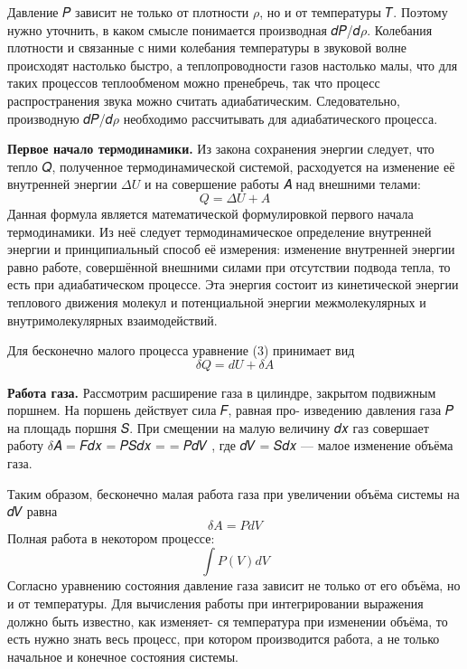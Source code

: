 \documentclass[12pt]{article}
\begin{document}
    Давление 𝑃 зависит не только от плотности $\rho$, но и от температуры 𝑇. Поэтому нужно уточнить, в каком смысле понимается
    производная 𝑑𝑃/𝑑$\rho$.
    Колебания плотности и связанные с ними колебания температуры в звуковой волне происходят настолько быстро, а теплопроводности газов настолько малы, что для таких процессов теплообменом можно пренебречь, так что процесс распространения звука можно считать адиабатическим. Следовательно, производную
    𝑑𝑃/𝑑$\rho$ необходимо рассчитывать для адиабатического процесса.
    
    \textbf{Первое начало термодинамики.} Из закона сохранения энергии следует, что тепло 𝑄, полученное термодинамической системой, расходуется на изменение её внутренней энергии $\Delta U$ и на
    совершение работы 𝐴 над внешними телами:
    \begin{equation}
    Q = \Delta U + A
    \end{equation}
    Данная формула является математической формулировкой первого начала термодинамики. Из неё следует термодинамическое
    определение внутренней энергии и принципиальный способ её измерения: изменение внутренней энергии равно работе, совершённой внешними силами при отсутствии подвода тепла, то есть при
    адиабатическом процессе. Эта энергия состоит из кинетической
    энергии теплового движения молекул и потенциальной энергии
    межмолекулярных и внутримолекулярных взаимодействий.
    
    Для бесконечно малого процесса уравнение (3) принимает вид
    \begin{equation}
    \delta Q = dU + \delta A
    \end{equation}
    
    \textbf{Работа газа.} Рассмотрим расширение газа в цилиндре, закрытом
    подвижным поршнем. На поршень действует сила 𝐹, равная про-
    изведению давления газа 𝑃 на площадь поршня 𝑆. При смещении
    на малую величину 𝑑𝑥 газ совершает работу $\delta$𝐴 = 𝐹𝑑𝑥 = 𝑃𝑆𝑑𝑥 =
    = 𝑃𝑑𝑉 , где 𝑑𝑉 = 𝑆𝑑𝑥 — малое изменение объёма газа.
    
    Таким образом, бесконечно малая работа газа при увеличении
    объёма системы на 𝑑𝑉 равна
    \begin{equation}
    \delta A = PdV
    \end{equation}
    Полная работа в некотором процессе: $$\int P(V)dV$$
    Согласно уравнению состояния давление газа зависит не только
    от его объёма, но и от температуры. Для вычисления работы при
    интегрировании выражения должно быть известно, как изменяет-
    ся температура при изменении объёма, то есть нужно знать весь
    процесс, при котором производится работа, а не только начальное
    и конечное состояния системы.
    
\end{document}
